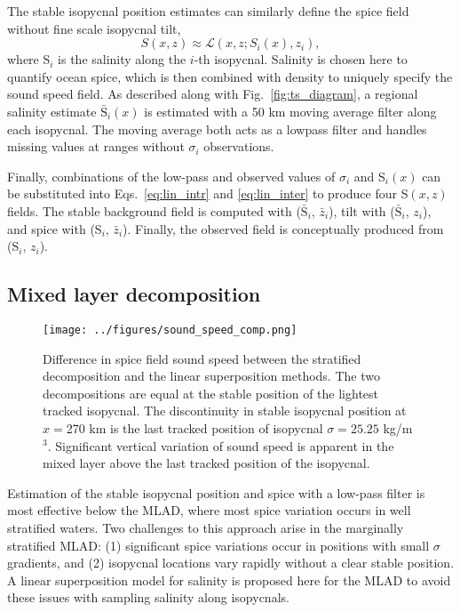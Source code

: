 \documentclass[preprint,NumberedRefs]{JASA}
\begin{document}
The stable isopycnal position estimates can similarly define the spice field without fine scale isopycnal tilt,
\begin{equation}
    S(x, z)\approx\mathcal{L}(x, z; S_i(x), z_i),
    \label{eq:lin_inter}
\end{equation}
where S$_i$ is the salinity along the $i$-th isopycnal. Salinity is chosen here to quantify ocean spice, which is then combined with density to uniquely specify the sound speed field\citep{TEOS10}. As described along with Fig.~\ref{fig:ts_diagram}, a regional salinity estimate $\bar{\textrm{S}}_i(x)$ is estimated with a 50 km moving average filter along each isopycnal. The moving average both acts as a lowpass filter and handles missing values at ranges without $\sigma_i$ observations.

Finally, combinations of the low-pass and observed values of $\sigma_i$ and S$_i(x)$ can be substituted into Eqs.~\eqref{eq:lin_intr} and \eqref{eq:lin_inter} to produce four S$(x,z)$ fields. The stable background field is computed with ($\bar{\textrm{S}}_i$, $\bar{z}_i$), tilt with ($\bar{\textrm{S}}_i$, $z_i$), and spice with (S$_i$, $\bar{z}_i$). Finally, the observed field is conceptually produced from (S$_i$, $z_i$).

\subsection{Mixed layer decomposition}\label{ssec:ml_decomp}
\begin{figure}
\texttt{[image: ../figures/sound\_speed\_comp.png]}
    \caption{\label{fig:c_diff}{Difference in spice field sound speed between the stratified decomposition and the linear superposition methods. The two decompositions are equal at the stable position of the lightest tracked isopycnal. The discontinuity in stable isopycnal position at $x=$270 km is the last tracked position of isopycnal $\sigma=25.25$ kg/m $^3$. Significant vertical variation of sound speed is apparent in the mixed layer above the last tracked position of the isopycnal.}}
\end{figure}

Estimation of the stable isopycnal position and spice with a low-pass filter is most effective below the MLAD, where most spice variation occurs in well stratified waters. Two challenges to this approach arise in the marginally stratified MLAD: (1) significant spice variations occur in positions with small $\sigma$ gradients, and (2) isopycnal locations vary rapidly without a clear stable position. A linear superposition model for salinity is proposed here for the MLAD to avoid these issues with sampling salinity along isopycnals.
\end{document}
